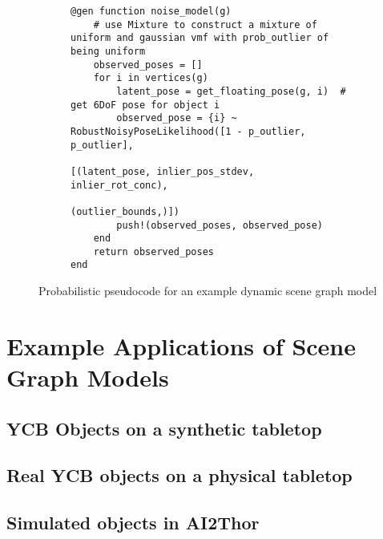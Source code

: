 \begin{figure}[p]
\begin{subfigure}{\textwidth}
\begin{lstlisting}
@gen function noise_model(g)
    # use Mixture to construct a mixture of uniform and gaussian vmf with prob_outlier of being uniform
    observed_poses = []
    for i in vertices(g)
        latent_pose = get_floating_pose(g, i)  # get 6DoF pose for object i
        observed_pose = {i} ~ RobustNoisyPoseLikelihood([1 - p_outlier, p_outlier],
                                                        [(latent_pose, inlier_pos_stdev, inlier_rot_conc),
                                                        (outlier_bounds,)])
        push!(observed_poses, observed_pose)
    end
    return observed_poses
end
\end{lstlisting}
\end{subfigure}

\caption{Probabilistic pseudocode for an example dynamic scene graph model}
\end{figure}

\section{Example Applications of Scene Graph Models}

\todo

\subsection{YCB Objects on a synthetic tabletop}

\todo

\subsection{Real YCB objects on a physical tabletop}

\todo

\subsection{Simulated objects in AI2Thor}

\todo
